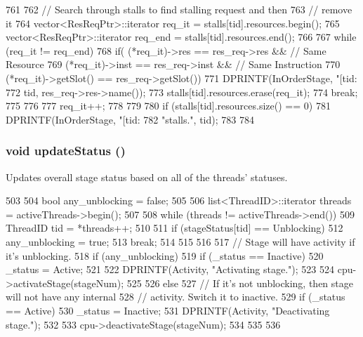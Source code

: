 \begin{DoxyCode}
761 {
762     // Search through stalls to find stalling request and then
763     // remove it
764     vector<ResReqPtr>::iterator req_it = stalls[tid].resources.begin();
765     vector<ResReqPtr>::iterator req_end = stalls[tid].resources.end();
766 
767     while (req_it != req_end) {
768         if( (*req_it)->res ==  res_req->res && // Same Resource
769             (*req_it)->inst ==  res_req->inst && // Same Instruction
770             (*req_it)->getSlot() ==  res_req->getSlot()) {
771             DPRINTF(InOrderStage, "[tid:%
772                     tid, res_req->res->name());
773             stalls[tid].resources.erase(req_it);
774             break;
775         }
776 
777         req_it++;
778     }
779 
780     if (stalls[tid].resources.size() == 0) {
781         DPRINTF(InOrderStage, "[tid:%
782                 "stalls.\n", tid);
783     }
784 }
\end{DoxyCode}
\hypertarget{classPipelineStage_a4bb9486757ce225941aaaf759b357a57}{
\subsubsection[{updateStatus}]{\setlength{\rightskip}{0pt plus 5cm}void updateStatus ()}}
\label{classPipelineStage_a4bb9486757ce225941aaaf759b357a57}
Updates overall stage status based on all of the threads' statuses. 


\begin{DoxyCode}
503 {
504     bool any_unblocking = false;
505 
506     list<ThreadID>::iterator threads = activeThreads->begin();
507 
508     while (threads != activeThreads->end()) {
509         ThreadID tid = *threads++;
510 
511         if (stageStatus[tid] == Unblocking) {
512             any_unblocking = true;
513             break;
514         }
515     }
516 
517     // Stage will have activity if it's unblocking.
518     if (any_unblocking) {
519         if (_status == Inactive) {
520             _status = Active;
521 
522             DPRINTF(Activity, "Activating stage.\n");
523 
524             cpu->activateStage(stageNum);
525         }
526     } else {
527         // If it's not unblocking, then stage will not have any internal
528         // activity.  Switch it to inactive.
529         if (_status == Active) {
530             _status = Inactive;
531             DPRINTF(Activity, "Deactivating stage.\n");
532 
533             cpu->deactivateStage(stageNum);
534         }
535     }
536 }
\end{DoxyCode}


